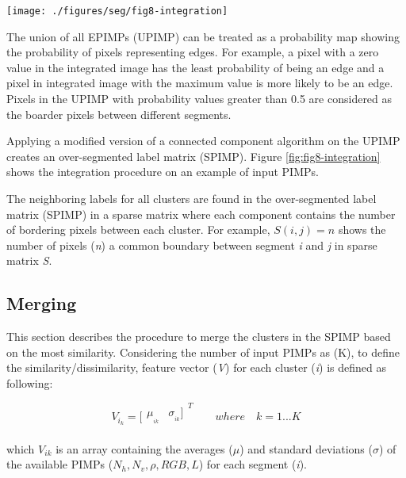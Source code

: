 \documentclass[final,3p,times,twocolumn,authoryear]{elsarticle}
\begin{document}
\begin{figure*}
	\centering
	\texttt{[image: ./figures/seg/fig8-integration]}
	\caption{Integration process for the input PIMPs showing the edges of segmented images (EPIMPs) (A,B,C,D,E), union of the all boundaries (UPIMP) (F), and over-segmented label matrix (SPIMP)(G)}
	\label{fig:fig8-integration}
\end{figure*}

The union of all EPIMPs (UPIMP) can be treated as a probability map showing the probability of pixels representing edges.  For example, a pixel with a zero value in the integrated image has the least probability of being an edge and a pixel in integrated image with the maximum value is more likely to be an edge. Pixels in the UPIMP with probability values greater than 0.5 are considered as the boarder pixels between different segments.

Applying a modified version of a connected component algorithm on the UPIMP creates an over-segmented label matrix (SPIMP). Figure \ref{fig:fig8-integration} shows the integration procedure on an example of input PIMPs. 

The neighboring labels for all clusters are found in the over-segmented label matrix (SPIMP) in a sparse matrix where each component contains the number of bordering pixels between each cluster. For example, $S(i,j) = n$ shows the number of pixels (\textit{n}) a common boundary between segment \textit{i} and \textit{j} in sparse matrix \textit{S}. 

\subsection{Merging}
This section describes the procedure to merge the clusters in the SPIMP based on the most similarity. Considering the number of input PIMPs as (K), to define the similarity/dissimilarity, feature vector (\textit{V}) for each cluster (\textit{i}) is defined as following: 

\begin{equation}
{{V}_{{{i}_{k}}}}=[{{\begin{matrix}
		{{\mu }_{_{ik}}} & {{\sigma }_{_{ik}}}]  \\
		\end{matrix}}^{T}} \qquad where \quad k=1...K
\end{equation}

\noindent which $V_{ik}$ is an array containing the averages ($\mu$) and standard deviations ($\sigma$) of the available PIMPs ($N_h, N_v, \rho, RGB, L$) for each segment (\textit{i}). 
\end{document}
